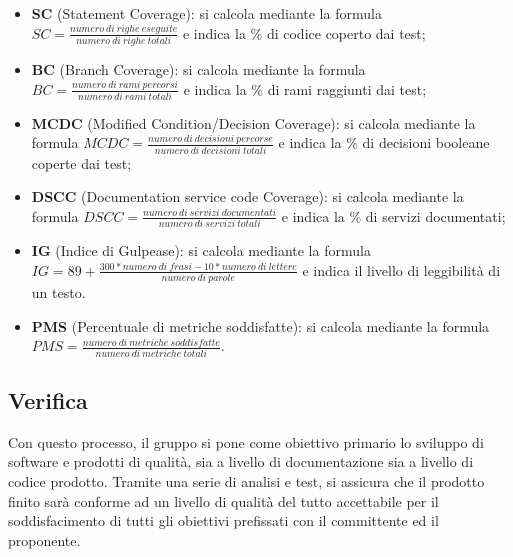\begin{itemize}
	\item \textbf{SC} (Statement Coverage): si calcola mediante la formula $SC = \frac{numero\ di\ righe\ eseguite}{numero\ di\ righe\ totali}$ e indica la \% di codice coperto dai test;
	\item \textbf{BC} (Branch Coverage): si calcola mediante la formula $BC = \frac{numero\ di\ rami\ percorsi}{numero\ di\ rami\ totali}$ e indica la \% di rami raggiunti dai test;
	\item \textbf{MCDC} (Modified Condition/Decision Coverage): si calcola mediante la formula \newline $MCDC = \frac{numero\ di\ decisioni\ percorse}{numero\ di\ decisioni\ totali}$ e indica la \% di decisioni booleane coperte dai test;
	\item \textbf{DSCC} (Documentation service code Coverage): si calcola mediante la formula \newline $DSCC = \frac{numero\ di\ servizi\ documentati}{numero\ di\ servizi\ totali}$ e indica la \% di servizi documentati;
\end{itemize}
\begin{itemize}
	\item \textbf{IG} (Indice di Gulpease): si calcola mediante la formula \newline $IG = 89+\frac{300*numero\ di\ frasi-10*numero\ di\ lettere}{numero\ di\ parole}$ e indica il livello di leggibilità di un testo.
\end{itemize}
\begin{itemize}
	\item \textbf{PMS} (Percentuale di metriche soddisfatte): si calcola mediante la formula \newline $PMS = \frac{numero\ di\ metriche\ soddisfatte}{numero\ di\ metriche\ totali}$.
\end{itemize}


\subsection{Verifica}
Con questo processo, il gruppo {\Gruppo} si pone come obiettivo primario lo sviluppo di software e prodotti di qualità, sia a livello di documentazione sia a livello di codice prodotto. Tramite una serie di analisi e test, si assicura che il prodotto finito sarà conforme ad un livello di qualità del tutto accettabile per il soddisfacimento di tutti gli obiettivi prefissati con il committente ed il proponente.
